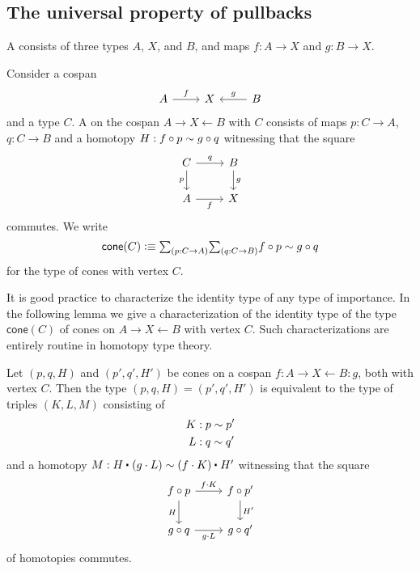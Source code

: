 \subsection{The universal property of pullbacks}

\begin{defn}\label{defn:cospan}
  A  consists of three types $A$, $X$, and $B$, and maps $f:A\to X$ and $g:B\to X$.
\end{defn}

\begin{defn}
  Consider a cospan
  \begin{equation*}
    \begin{tikzcd}
      A \arrow[r,"f"] & X & B \arrow[l,swap,"g"] 
    \end{tikzcd}
  \end{equation*}
  and a type $C$. A  on the cospan $A \rightarrow X \leftarrow B$ with  $C$ consists of maps $p:C\to A$, $q:C\to B$ and a homotopy $H:f\circ p\sim g\circ q$ witnessing that the square
  \begin{equation*}
    \begin{tikzcd}
      C \arrow[r,"q"] \arrow[d,swap,"p"] & B \arrow[d,"g"] \\
      A \arrow[r,swap,"f"] & X
    \end{tikzcd}
  \end{equation*}
  commutes. We write
\begin{equation*}
\mathsf{cone}(C)\defeq \sm{p:C\to A}{q:C\to B}f\circ p\htpy g\circ q
\end{equation*}
for the type of cones with vertex $C$.
\end{defn}

It is good practice to characterize the identity type of any type of importance. In the following lemma we give a characterization of the identity type of the type $\mathsf{cone}(C)$ of cones on $A\rightarrow X\leftarrow B$ with vertex $C$. Such characterizations are entirely routine in homotopy type theory.

\begin{lem}\label{lem:id_cone}%
%
Let $(p,q,H)$ and $(p',q',H')$ be cones on a cospan $f:A\rightarrow X \leftarrow B:g$, both with vertex $C$. Then the type $(p,q,H)=(p',q',H')$ is equivalent to the type of triples $(K,L,M)$ consisting of
\begin{align*}
K & : p \sim p' \\
L & : q \sim q'
\end{align*}
and a homotopy $M : \ct{H}{(g\cdot L)} \htpy \ct{(f\cdot K)}{H'}$ witnessing that the square
\begin{equation*}
\begin{tikzcd}
f\circ p \arrow[r,"f\cdot K"] \arrow[d,swap,"H"] & f\circ p' \arrow[d,"{H'}"] \\
g\circ q \arrow[r,swap,"g\cdot L"] & g\circ q'
\end{tikzcd}
\end{equation*}
of homotopies commutes.
\end{lem}

